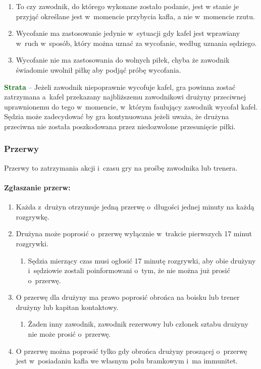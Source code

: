 \documentclass[12pt,a4paper]{article}
\newcommand\other[1]{\bgroup\textcolor{darkgreen}{\textbf{#1}}}
\begin{document}
\begin{enumerate}
	\item
		To czy zawodnik, do którego wykonane zostało podanie,
		jest w stanie je przyjąć określane jest w~momencie przybycia kafla, a
	      nie w~momencie rzutu.
	\item
	      Wycofanie ma zastosowanie jedynie w~sytuacji gdy kafel jest wprawiany
	      w~ruch w~sposób, który można uznać za wycofanie, według uznania
	      sędziego.
	\item
	      Wycofanie nie ma zastosowania do wolnych piłek, chyba że zawodnik
	      świadomie uwolnił piłkę aby podjąć próbę wycofania.
\end{enumerate}

\other{Strata} -- Jeżeli zawodnik niepoprawnie wycofuje kafel, gra powinna
zostać zatrzymana a~kafel przekazany najbliższemu zawodnikowi drużyny
przeciwnej uprawnionemu do tego w~momencie, w~którym faulujący zawodnik
wycofał kafel. Sędzia może zadecydować by gra kontynuowana jeżeli uważa,
że drużyna przeciwna nie została poszkodowana przez niedozwolone
przesunięcie piłki.

\subsubsection{Przerwy}

Przerwy to zatrzymania akcji i~czasu gry na prośbę zawodnika lub trenera.

\paragraph{Zgłaszanie przerw:}

\begin{enumerate}
	\item
	      Każda z~drużyn otrzymuje jedną przerwę o~długości jednej minuty na
	      każdą rozgrywkę.
	\item
	      Drużyna może poprosić o~przerwę wyłącznie w~trakcie pierwszych 17
	      minut rozgrywki.

	      \begin{enumerate}
		      \item
		            Sędzia mierzący czas musi ogłosić 17 minutę rozgrywki, aby obie
		            drużyny i~sędziowie zostali poinformowani o~tym, że nie można już
		            prosić o~przerwę.
	      \end{enumerate}
	\item
	      O przerwę dla drużyny ma prawo poprosić obrońca na boisku lub trener
	      drużyny lub kapitan kontaktowy.

	      \begin{enumerate}
		      \item
		            Żaden inny zawodnik, zawodnik rezerwowy lub członek sztabu drużyny
		            nie może prosić o~przerwę.
	      \end{enumerate}
	\item
	      O przerwę można poprosić tylko gdy obrońca drużyny proszącej o~przerwę
	      jest w~posiadaniu kafla we własnym polu bramkowym i~ma immunitet.
\end{enumerate}
\end{document}
